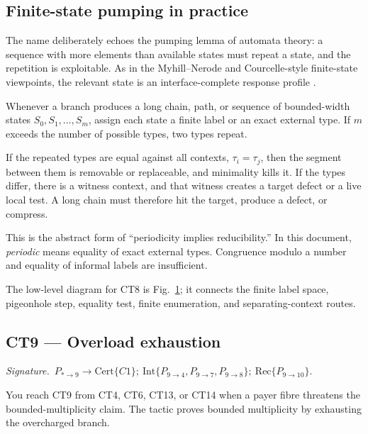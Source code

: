 \documentclass[
  11pt,
]{article}
\theoremstyle{definition}
\newcommand{\ctsignature}[1]{\par\noindent\emph{Signature.}\ #1\par\medskip}
\newcommand{\ctcert}[1]{\mathrm{Cert}\{#1\}}
\newcommand{\ctint}[1]{\mathrm{Int}\{#1\}}
\newcommand{\ctrec}[1]{\mathrm{Rec}\{#1\}}
\begin{document}
\begin{figure}[p]
\label{fig:ct8-finite-state-pumping}
\end{figure}
\FloatBarrier

\subsection*{Finite-state pumping in practice}

The name deliberately echoes the pumping lemma of automata theory: a
sequence with more elements than available states must repeat a state,
and the repetition is exploitable. As in the Myhill--Nerode and
Courcelle-style finite-state viewpoints, the relevant state is an
interface-complete response profile
\citep{myhill-1957-automata, nerode-1958-linear, courcelle-1990-mso-graphs, courcelle-engelfriet-2012-graph-structure}.

Whenever a branch produces a long chain, path, or sequence of
bounded-width states \(S_0, S_1, \ldots, S_m\), assign each state a
finite label or an exact external type. If \(m\) exceeds the number of
possible types, two types repeat.

If the repeated types are equal against all contexts,
\(\tau_i = \tau_j\), then the segment between them is removable or
replaceable, and minimality kills it. If the types differ, there is a
witness context, and that witness creates a target defect or a live
local test. A long chain must therefore hit the target, produce a
defect, or compress.

This is the abstract form of ``periodicity implies reducibility.'' In
this document, \emph{periodic} means equality of exact external types.
Congruence modulo a number and equality of informal labels are
insufficient.

The low-level diagram for CT8 is Fig.~\ref{fig:ct8-finite-state-pumping};
it connects the finite label space, pigeonhole step, equality test,
finite enumeration, and separating-context routes.



\subsection{CT9 --- Overload exhaustion}\label{ct:9}\label{the-charging-principle-in-general-form}
\ctsignature{\(P_{\ast\to9}\to \ctcert{C1};\ \ctint{P_{9\to4},P_{9\to7},P_{9\to8}};\ \ctrec{P_{9\to10}}\).}

You reach CT9 from CT4, CT6, CT13, or CT14 when a payer fibre threatens
the bounded-multiplicity claim.  The tactic proves bounded multiplicity
by exhausting the overcharged branch.
\end{document}

